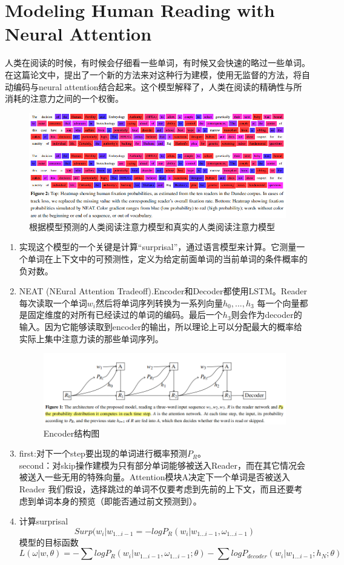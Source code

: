 \documentclass[a4paper,UTF8]{article}
\numberwithin{equation}{section}
\begin{document}
\section{Modeling Human Reading with Neural Attention}
人类在阅读的时候，有时候会仔细看一些单词，有时候又会快速的略过一些单词。在这篇论文中，提出了一个新的方法来对这种行为建模，使用无监督的方法，将自动编码与neural attention结合起来。这个模型解释了，人类在阅读的精确性与所消耗的注意力之间的一个权衡。

\begin{figure}[H]
    \centering
    \includegraphics[width=\textwidth]{8-1.png}
    \caption{根据模型预测的人类阅读注意力模型和真实的人类阅读注意力模型}
\end{figure}
\begin{enumerate}
    \item 实现这个模型的一个关键是计算“surprisal”，通过语言模型来计算。它测量一个单词在上下文中的可预测性，定义为给定前面单词的当前单词的条件概率的负对数。
    \item  NEAT (NEural Attention Tradeoff).Encoder和Decoder都使用LSTM。Reader每次读取一个单词$w_i$然后将单词序列转换为一系列向量$h_0,...,h_3$
    每一个向量都是固定维度的对所有已经读过的单词的编码。最后一个$h_3$则会作为decoder的输入。因为它能够读取到encoder的输出，所以理论上可以分配最大的概率给实际上集中注意力读的那些单词序列。
        \begin{figure}[H]
        \centering
        \includegraphics[width=\textwidth]{8-2.png}
        \caption{Encoder结构图}
    \end{figure}
    \item first:对下一个step要出现的单词进行概率预测$P_R$。\\
    second：对skip操作建模为只有部分单词能够被送入Reader，而在其它情况会被送入一些无用的特殊向量。Attention模块A决定下一个单词是否被送入Reader
    我们假设，选择跳过的单词不仅要考虑到先前的上下文，而且还要考虑到单词本身的预览（即能否通过前文预测到）。
    \item 计算surprisal\\$$Surp(w_i|w_{1...i-1} = - log P_R(w_i|w_{1...i-1},\omega_{1...i-1})$$
    模型的目标函数$$L(\omega|w,\theta)=-\sum log P_R (w_i|w_{1...i-1},\omega_{1...i-1};\theta)-\sum log P_{decoder}(w_i|w_{1...i-1};h_N;\theta)$$
\end{enumerate}
\newpage
\end{document}
